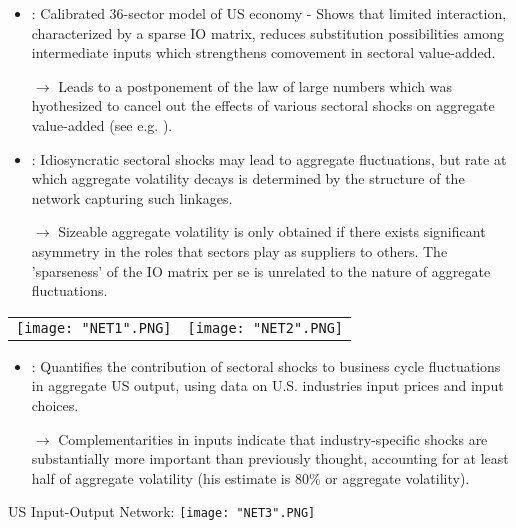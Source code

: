 \documentclass[compress,xcolor=dvipsnames]{beamer}
\begin{document}
\begin{frame}
\begin{itemize}
\item \citet{horvath2000}: Calibrated 36-sector model of US economy - Shows that limited interaction, characterized by a sparse IO matrix, reduces substitution possibilities among intermediate inputs which strengthens comovement in sectoral value-added.  
\item[$\to$] Leads to a postponement of the law of large numbers which was hyothesized to cancel out the effects of various sectoral shocks on aggregate value-added (see e.g. \citet{dupor1999aggregation}).

\item \citet{Acemoglu2012}: Idiosyncratic sectoral shocks may lead to aggregate fluctuations, but rate at which aggregate volatility decays is determined by the structure of the network capturing such linkages. 
\item[$\to$] Sizeable aggregate volatility is only obtained if there exists significant asymmetry in the roles that sectors play as suppliers to others. The 'sparseness' of the IO matrix per se is unrelated to the nature of aggregate fluctuations.
\end{itemize}
\end{frame}

\begin{frame}
\begin{tabular}{cc}
\texttt{[image: "NET1".PNG]} &
\texttt{[image: "NET2".PNG]}
\end{tabular}
\begin{itemize}
\item \citet{Atalay2017}: Quantifies the contribution of sectoral shocks to business cycle fluctuations in aggregate US output, using data on U.S. industries input prices and input choices. 
\item[$\to$] Complementarities in inputs indicate that industry-specific shocks are substantially more important than previously thought, accounting for at least half of aggregate volatility (his estimate is 80\% or aggregate volatility).
\end{itemize}
\end{frame}


\begin{frame}
US Input-Output Network:
\texttt{[image: "NET3".PNG]}
\end{frame}
\end{document}
